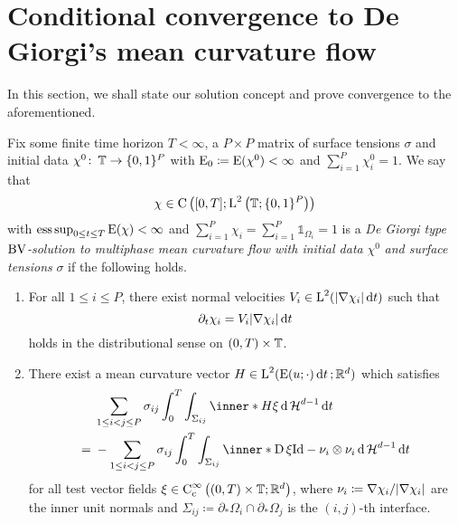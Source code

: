 \section{Conditional convergence to De Giorgi's mean curvature flow}

In this section, we shall state our solution concept and prove convergence to 
the aforementioned.

\begin{definition}
	\label{de_giorgi_solution_to_mmcf}
	Fix some finite time horizon $ T < \infty $, a $ P \times P $ matrix of 
	surface tensions $ \sigma $ and initial data $ \chi^{ 0 } \colon \operatorname{\mathbb{T}} 
	\to \{ 0 , 1 \}^{ P } $ with $ \operatorname{E}_{ 0 } \coloneqq \operatorname{E} ( \chi^{ 0 } 
	) < \infty $ and 
	$ \sum_{ i = 1 }^{ P } \chi_{ i }^{ 0 } = 1 $. We say that
	\begin{equation*}
		\chi \in \operatorname{C} \left(
		[ 0 , T ]
		;
		\operatorname{L}^{ 2 } \left( \operatorname{\mathbb{T}} ; \{ 0 , 1 \}^{ P } \right)
		\right)
	\end{equation*}
	with $ \operatorname*{ess\,sup}_{ 0 \leq t \leq T } \operatorname{E} ( \chi ) < \infty  $ and $ 
	\sum_{ i = 1 
	}^{ P } \chi_{ i } = \sum_{ i = 1 }^{ P } \mathds{ 1 }_{ \Omega_{ i } } = 
	1  $ is a \emph{De Giorgi type }$\operatorname{BV}$\emph{-solution to multiphase mean 
	curvature flow with initial data} $ \chi^{ 0 } $ \emph{and surface 
	tensions} $ \sigma $ if the following holds. 
	\begin{enumerate}
		\item 
		For all $ 1 \leq i \leq P $, there exist normal 
		velocities $ V_{ i } \in \operatorname{L}^{ 2 } ( \abs{ \nabla \chi_{ i } } \dd{ t } 
		) $ 
		such that
		\begin{equation*}
			\partial_{ t } \chi_{ i }
			=
			V_{ i } \abs{ \nabla \chi_{ i } } \dd{ t }
		\end{equation*}
		holds in the distributional sense on $ ( 0 , T ) \times \operatorname{\mathbb{T}} $.
		
		\item 
		There exist a mean curvature vector $ H \in 
		\operatorname{L}^{ 2 } ( \operatorname{E} ( u ; \cdot) \dd{ t } ; \mathbb{ R }^{ d } ) $ 
		which satisfies
		\begin{align}
			\notag
			& 
			\sum_{ 1 \leq i < j \leq P }
			\sigma_{ i j }
			\int_{ 0 }^{ T }
				\int_{ \Sigma_{ i j } }
				\inner*{ H }{ \xi }
				\dd{ \hm^{ d - 1 } }
			\dd{ t }
			\\
			\label{mean_curvature_vector_bv_de_giorgi}
			={} &
			-
			\sum_{ 1 \leq i < j \leq P }
			\sigma_{ i j }
			\int_{ 0 }^{ T }
				\int_{ \Sigma_{ i j } }
					\inner*{
						\diff \xi }
					{ \mathrm{Id} - \nu_{ i } \otimes \nu_{ i } }
				\dd{ \hm^{ d - 1 } }
			\dd{ t }
		\end{align}
		for all test vector fields 
		$ \xi \in \operatorname{C}_{ \mathrm{c} }^{ \infty } \left(
			( 0 , T ) \times \operatorname{\mathbb{T}} ; \mathbb{ R }^{ d }
		\right) $,
		where $ \nu_{ i } \coloneqq \nabla \chi_{ i } / \abs{ \nabla \chi_{ i } 
		} $ are the inner unit normals and $ \Sigma_{ i j } \coloneqq 
		\partial_{ \ast } \Omega_{ i } \cap \partial_{ \ast } \Omega_{ j } $
		is the $ (i, j )$-th interface.
		

\end{enumerate}
\end{definition}
